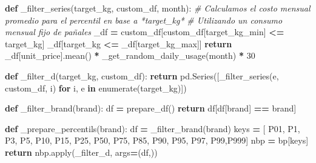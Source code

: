 \documentclass[
]{article}
\newenvironment{Shaded}{\begin{snugshade}}{\end{snugshade}}
\newcommand{\BuiltInTok}[1]{#1}
\newcommand{\CommentTok}[1]{\textcolor[rgb]{0.56,0.35,0.01}{\textit{#1}}}
\newcommand{\ControlFlowTok}[1]{\textcolor[rgb]{0.13,0.29,0.53}{\textbf{#1}}}
\newcommand{\DecValTok}[1]{\textcolor[rgb]{0.00,0.00,0.81}{#1}}
\newcommand{\KeywordTok}[1]{\textcolor[rgb]{0.13,0.29,0.53}{\textbf{#1}}}
\newcommand{\NormalTok}[1]{#1}
\newcommand{\OperatorTok}[1]{\textcolor[rgb]{0.81,0.36,0.00}{\textbf{#1}}}
\newcommand{\StringTok}[1]{\textcolor[rgb]{0.31,0.60,0.02}{#1}}
\begin{document}
\begin{Shaded}
\begin{Highlighting}[]
\KeywordTok{def}\NormalTok{ \_filter\_series(target\_kg, custom\_df, month):}
    \CommentTok{\# Calculamos el costo mensual promedio para el percentil en base a *target\_kg*}
    \CommentTok{\# Utilizando un consumo mensual fijo de pañales}
\NormalTok{    \_df }\OperatorTok{=}\NormalTok{ custom\_df[custom\_df[}\StringTok{\textquotesingle{}target\_kg\_min\textquotesingle{}}\NormalTok{] }\OperatorTok{\textless{}=}\NormalTok{ target\_kg]}
\NormalTok{    \_df[target\_kg }\OperatorTok{\textless{}=}\NormalTok{ \_df[}\StringTok{\textquotesingle{}target\_kg\_max\textquotesingle{}}\NormalTok{]]}
    \ControlFlowTok{return}\NormalTok{ \_df[}\StringTok{\textquotesingle{}unit\_price\textquotesingle{}}\NormalTok{].mean() }\OperatorTok{*}\NormalTok{ \_get\_random\_daily\_usage(month) }\OperatorTok{*} \DecValTok{30}

\KeywordTok{def}\NormalTok{ \_filter\_d(target\_kg, custom\_df):}
    \ControlFlowTok{return}\NormalTok{ pd.Series([\_filter\_series(e, custom\_df, i) }\ControlFlowTok{for}\NormalTok{ i, e }\KeywordTok{in} \BuiltInTok{enumerate}\NormalTok{(target\_kg)])}


\KeywordTok{def}\NormalTok{ \_filter\_brand(brand):}
\NormalTok{    df }\OperatorTok{=}\NormalTok{ prepare\_df()}
    \ControlFlowTok{return}\NormalTok{ df[df[}\StringTok{\textquotesingle{}brand\textquotesingle{}}\NormalTok{] }\OperatorTok{==}\NormalTok{ brand]}

\KeywordTok{def}\NormalTok{ \_prepare\_percentils(brand):}
\NormalTok{    df }\OperatorTok{=}\NormalTok{ \_filter\_brand(brand)}
\NormalTok{    keys }\OperatorTok{=}\NormalTok{ [ }\StringTok{\textquotesingle{}P01\textquotesingle{}}\NormalTok{, }\StringTok{\textquotesingle{}P1\textquotesingle{}}\NormalTok{, }\StringTok{\textquotesingle{}P3\textquotesingle{}}\NormalTok{, }\StringTok{\textquotesingle{}P5\textquotesingle{}}\NormalTok{, }\StringTok{\textquotesingle{}P10\textquotesingle{}}\NormalTok{, }\StringTok{\textquotesingle{}P15\textquotesingle{}}\NormalTok{, }\StringTok{\textquotesingle{}P25\textquotesingle{}}\NormalTok{, }\StringTok{\textquotesingle{}P50\textquotesingle{}}\NormalTok{, }\StringTok{\textquotesingle{}P75\textquotesingle{}}\NormalTok{, }\StringTok{\textquotesingle{}P85\textquotesingle{}}\NormalTok{, }\StringTok{\textquotesingle{}P90\textquotesingle{}}\NormalTok{, }\StringTok{\textquotesingle{}P95\textquotesingle{}}\NormalTok{, }\StringTok{\textquotesingle{}P97\textquotesingle{}}\NormalTok{, }\StringTok{\textquotesingle{}P99\textquotesingle{}}\NormalTok{,}\StringTok{\textquotesingle{}P999\textquotesingle{}}\NormalTok{]}
\NormalTok{    nbp }\OperatorTok{=}\NormalTok{ bp[keys]}
    \ControlFlowTok{return}\NormalTok{ nbp.}\BuiltInTok{apply}\NormalTok{(\_filter\_d, args}\OperatorTok{=}\NormalTok{(df,))}


\end{Highlighting}
\end{Shaded}
\end{document}

